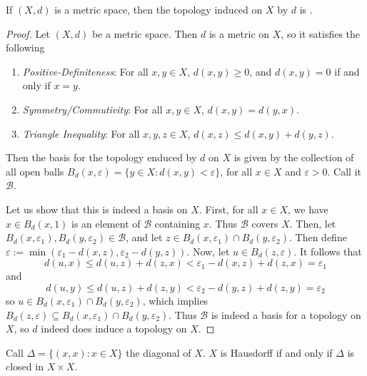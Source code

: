 \documentclass[12pt, a4paper, oneside, openright, titlepage]{book}
\begin{document}
\begin{exercise}
    If $(X,d)$ is a metric space, then the topology induced on $X$ by $d$ is . 
\end{exercise}
\begin{proof}
    Let $(X,d)$ be a metric space. Then $d$ is a metric on $X$, so it satisfies the following \begin{enumerate}
        \item \emph{Positive-Definiteness}: For all $x,y \in X$, $d(x,y) \geq 0$, and $d(x,y) = 0$ if and only if $x = y$.
        \item \emph{Symmetry/Commutivity}: For all $x,y \in X$, $d(x,y) = d(y,x)$.
        \item \emph{Triangle Inequality}: For all $x,y,z \in X$, $d(x,z) \leq d(x,y) + d(y,z)$.
    \end{enumerate}
    Then the basis for the topology enduced by $d$ on $X$ is given by the collection of all open balls $B_d(x,\varepsilon) = \{y \in X: d(x,y) < \varepsilon\}$, for all $x \in X$ and $\varepsilon > 0$. Call it $\mathcal{B}$.

    Let us show that this is indeed a basis on $X$. First, for all $x \in X$, we have $x \in B_d(x,1)$ is an element of $\mathcal{B}$ containing $x$. Thus $\mathcal{B}$ covers $X$. Then, let $B_d(x,\varepsilon_1),B_d(y,\varepsilon_2) \in \mathcal{B}$, and let $z \in B_d(x,\varepsilon_1)\cap B_d(y,\varepsilon_2)$. Then define $\varepsilon := \min(\varepsilon_1 - d(x,z), \varepsilon_2 -d(y,z))$. Now, let $u \in B_d(z,\varepsilon)$. It follows that \begin{equation*}
        d(u,x) \leq d(u,z) + d(z,x) < \varepsilon_1 - d(x,z) + d(z,x) = \varepsilon_1
    \end{equation*}
    and \begin{equation*}
        d(u,y) \leq d(u,z) + d(z,y) < \varepsilon_2 - d(y,z) + d(z,y) = \varepsilon_2
    \end{equation*}
    so $u \in B_d(x,\varepsilon_1)\cap B_d(y,\varepsilon_2)$, which implies $B_d(z,\varepsilon) \subseteq B_d(x,\varepsilon_1)\cap B_d(y,\varepsilon_2)$. Thus $\mathcal{B}$ is indeed a basis for a topology on $X$, so $d$ indeed does induce a topology on $X$.
\end{proof}

\begin{exercise}
    Call $\Delta = \{(x,x): x \in X\}$ the diagonal of $X$. $X$ is Hausdorff if and only if $\Delta$ is closed in $X \times X$.
\end{exercise}
\end{document}
